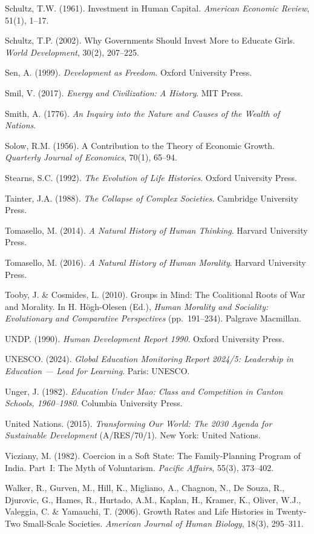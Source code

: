 Schultz, T.W. (1961). Investment in Human Capital.
\emph{American Economic Review}, 51(1), 1--17.

Schultz, T.P. (2002). Why Governments Should Invest More to Educate
Girls. \emph{World Development}, 30(2), 207--225.

Sen, A. (1999). \emph{Development as Freedom}. Oxford University Press.

Smil, V. (2017). \emph{Energy and Civilization: A History}. MIT Press.

Smith, A. (1776). \emph{An Inquiry into the Nature and Causes of the
Wealth of Nations}.

Solow, R.M. (1956). A Contribution to the Theory of Economic Growth.
\emph{Quarterly Journal of Economics}, 70(1), 65--94.

Stearns, S.C. (1992). \emph{The Evolution of Life Histories}. Oxford
University Press.

Tainter, J.A. (1988). \emph{The Collapse of Complex Societies}. Cambridge University Press.

Tomasello, M. (2014). \emph{A Natural History of Human Thinking}.
Harvard University Press.

Tomasello, M. (2016). \emph{A Natural History of Human Morality}.
Harvard University Press.

Tooby, J. \& Cosmides, L. (2010). Groups in Mind: The Coalitional Roots
of War and Morality. In H. H\"{o}gh-Olesen (Ed.), \emph{Human Morality
and Sociality: Evolutionary and Comparative Perspectives} (pp.~191--234).
Palgrave Macmillan.

UNDP. (1990). \emph{Human Development Report 1990}. Oxford University
Press.

UNESCO. (2024). \emph{Global Education Monitoring Report 2024/5:
Leadership in Education --- Lead for Learning}. Paris: UNESCO.

Unger, J. (1982). \emph{Education Under Mao: Class and Competition in
Canton Schools, 1960--1980}. Columbia University Press.

United Nations. (2015). \emph{Transforming Our World: The 2030 Agenda
for Sustainable Development} (A/RES/70/1). New York: United Nations.

Vicziany, M. (1982). Coercion in a Soft State: The Family-Planning
Program of India. Part~I: The Myth of Voluntarism. \emph{Pacific
Affairs}, 55(3), 373--402.

Walker, R., Gurven, M., Hill, K., Migliano, A., Chagnon, N., De
Souza, R., Djurovic, G., Hames, R., Hurtado, A.M., Kaplan, H.,
Kramer, K., Oliver, W.J., Valeggia, C. \& Yamauchi, T. (2006). Growth
Rates and Life Histories in Twenty-Two Small-Scale Societies.
\emph{American Journal of Human Biology}, 18(3), 295--311.


